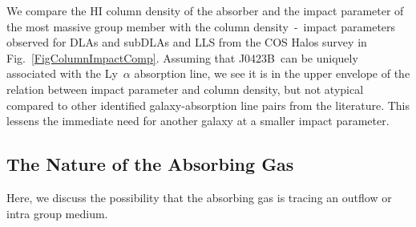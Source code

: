 \documentclass[a4paper,fleqn,usenatbib]{mnras}
\newcommand{\GalB}{J0423B}
\begin{document}
We compare the HI column density of the absorber and the impact parameter of the most massive group member with the column density~-~impact parameters observed for DLAs \mbox{\citep{Zwaan2005reconciling, Peroux2011sinfoni}} and subDLAs and LLS from the COS Halos survey \mbox{\citep{Prochaska2017cos}} in Fig.~\ref{FigColumnImpactComp}. Assuming that \GalB\ can be uniquely associated with the Ly~$\alpha$ absorption line, we see it is in the upper envelope of the relation between impact parameter and column density, but not atypical compared to other identified galaxy-absorption line pairs from the literature. This lessens the immediate need for another galaxy at a smaller impact parameter.


\subsection{The Nature of the Absorbing Gas}

Here, we discuss the possibility that the absorbing gas is tracing an outflow or intra group medium.
\end{document}
